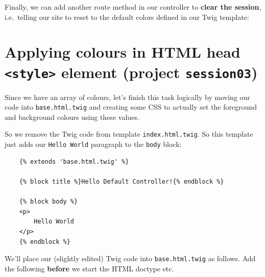 \documentclass[a4paperpaper,openright]{book}
\newenvironment{Shaded}{}{}
\newcommand{\AnnotationTok}[1]{\textcolor[rgb]{0.38,0.63,0.69}{\textbf{\textit{#1}}}}
\newcommand{\CommentTok}[1]{\textcolor[rgb]{0.38,0.63,0.69}{\textit{#1}}}
\newcommand{\KeywordTok}[1]{\textcolor[rgb]{0.00,0.44,0.13}{\textbf{#1}}}
\newcommand{\NormalTok}[1]{#1}
\newcommand{\OtherTok}[1]{\textcolor[rgb]{0.00,0.44,0.13}{#1}}
\newcommand{\StringTok}[1]{\textcolor[rgb]{0.25,0.44,0.63}{#1}}
\begin{document}
Finally, we can add another route method in our controller to
\textbf{clear the session}, i.e.~telling our site to reset to the
default colors defined in our Twig template:

\begin{Shaded}
\end{Shaded}

\hypertarget{applying-colours-in-html-head-style-element-project-session03}{%
\section{\texorpdfstring{Applying colours in HTML head
\texttt{\textless{}style\textgreater{}} element (project
\texttt{session03})}{Applying colours in HTML head \textless{}style\textgreater{} element (project session03)}}\label{applying-colours-in-html-head-style-element-project-session03}}

Since we have an array of colours, let's finish this task logically by
moving our code into \texttt{base.html.twig} and creating some CSS to
actually set the foreground and background colours using these values.

So we remove the Twig code from template \texttt{index.html.twig}. So
this template just adds our \texttt{Hello\ World} paragraph to the
\texttt{body} block:

\begin{verbatim}
    {% extends 'base.html.twig' %}
    
    {% block title %}Hello Default Controller!{% endblock %}
    
    {% block body %}
    <p>
        Hello World
    </p>
    {% endblock %}
\end{verbatim}

We'll place our (slightly edited) Twig code into \texttt{base.html.twig}
as follows. Add the following \textbf{before} we start the HTML doctype
etc.
\end{document}
